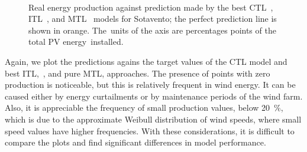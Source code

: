 \begin{figure}[H]
    \centering%
    \quad%
    \quad%
    \\
 \caption{\label{fig:stv_best_plots} Real energy production against prediction made by the best CTL~\protect{}, ITL~\protect{}, and MTL~\protect{} models for Sotavento; the perfect prediction line is shown in orange. The~units of the axis are percentages points of the total PV energy~installed.}
 \end{figure}

%
Again, we plot the predictions agains the target values of the CTL model and best ITL,~, and pure MTL,  approaches.
The presence of points with zero production is noticeable, but this is relatively frequent in wind energy. It can be caused either by energy curtailments or by maintenance periods of the wind farm.
Also, it is appreciable the frequency of small production values, below \SI{20}{\percent}, which is due to the approximate Weibull distribution of wind speeds, where small speed values have higher frequencies. 
With these considerations, it is difficult to compare the plots and find significant differences in model performance.










